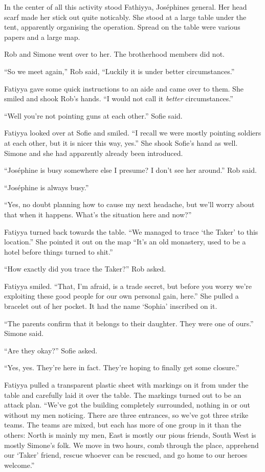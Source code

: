 \documentclass[letterpaper,12pt]{report}
\begin{document}
In the center of all this activity stood Fathiyya, Jos\'ephines general. Her head scarf made her stick out quite noticably. She stood at a large table under the tent, apparently organising the operation. Spread on the table were various papers and a large map.

Rob and Simone went over to her. The brotherhood members did not.

``So we meet again,'' Rob said, ``Luckily it is under better circumstances.''

Fatiyya gave some quick instructions to an aide and came over to them. She smiled and shook Rob's hands. ``I would not call it \textit{better} circumstances.''

``Well you're not pointing guns at each other.'' Sofie said.

Fatiyya looked over at Sofie and smiled. ``I recall we were mostly pointing soldiers at each other, but it is nicer this way, yes.'' She shook Sofie's hand as well. Simone and she had apparently already been introduced.

``Jos\'ephine is busy somewhere else I presume? I don't see her around.'' Rob said.

``Jos\'ephine is always busy.''

``Yes, no doubt planning how to cause my next headache, but we'll worry about that when it happens. What's the situation here and now?''

Fatiyya turned back towards the table. ``We managed to trace `the Taker' to this location.'' She pointed it out on the map ``It's an old monastery, used to be a hotel before things turned to shit.''

``How exactly did you trace the Taker?'' Rob asked.

Fatiyya smiled. ``That, I'm afraid, is a trade secret, but before you worry we're exploiting these good people for our own personal gain, here.'' She pulled a bracelet out of her pocket. It had the name `Sophia' inscribed on it.

``The parents confirm that it belongs to their daughter. They were one of ours.'' Simone said.

``Are they okay?'' Sofie asked.

``Yes, yes. They're here in fact. They're hoping to finally get some closure.''

Fatiyya pulled a transparent plastic sheet with markings on it from under the table and carefully laid it over the table. The markings turned out to be an attack plan. ``We've got the building completely surrounded, nothing in or out without my men noticing. There are three entrances, so we've got three strike teams. The teams are mixed, but each has more of one group in it than the others: North is mainly my men, East is mostly our pious friends, South West is mostly Simone's folk. We move in two hours, comb through the place, apprehend our `Taker' friend, rescue whoever can be rescued, and go home to our heroes welcome.''
\end{document}
